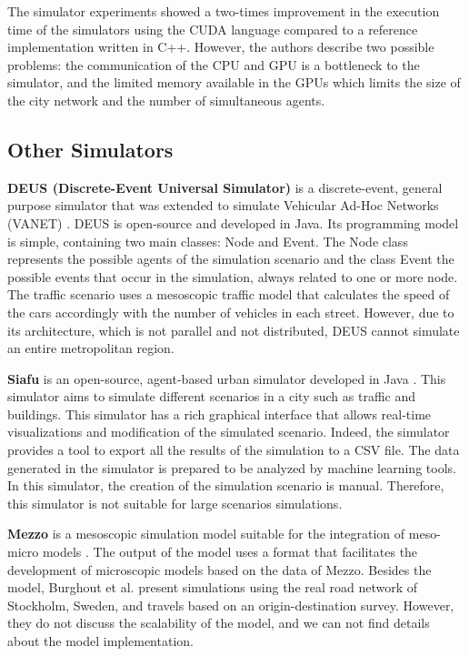The simulator experiments showed a two-times improvement in the execution time of the simulators using the CUDA language compared to a reference implementation written in C++. However, the authors describe two possible problems: the communication of the CPU and GPU is a bottleneck to the simulator, and the limited memory available in the GPUs which limits the size of the city network and the number of simultaneous agents.

\subsection{Other Simulators}

\textbf{DEUS (Discrete-Event Universal Simulator)} is a discrete-event, general purpose simulator that was extended to simulate Vehicular Ad-Hoc Networks (VANET) \cite{picone2012simulating}.  DEUS is open-source and developed in Java. Its programming model is simple, containing two main classes: Node and Event. The Node class represents the possible agents of the simulation scenario and the class Event the possible events that occur in the simulation, always related to one or more node. The traffic scenario uses a mesoscopic traffic model that calculates the speed of the cars accordingly with the number of vehicles in each street. However, due to its architecture, which is not parallel and not distributed, DEUS cannot simulate an entire metropolitan region.

\textbf{Siafu} is an open-source, agent-based urban simulator developed in Java \cite{nazario2014toward}. This simulator aims to simulate different scenarios in a city such as traffic and buildings. This simulator has a rich graphical interface that allows real-time visualizations and modification of the simulated scenario. Indeed, the simulator provides a tool to export all the results of the simulation to a CSV file. The data generated in the simulator is prepared to be analyzed by machine learning tools. In this simulator, the creation of the simulation scenario is manual. Therefore, this simulator is not suitable for large scenarios simulations.

\textbf{Mezzo} is a mesoscopic simulation model suitable for the integration of meso-micro models \cite{burghout2006discrete}. The output of the model uses a format that facilitates the development of microscopic models based on the data of Mezzo. Besides the model, Burghout et al. \cite{burghout2006discrete}  present simulations using the real road network of Stockholm, Sweden, and travels based on an origin-destination survey. However, they do not discuss the scalability of the model, and we can not find details about the model implementation.


